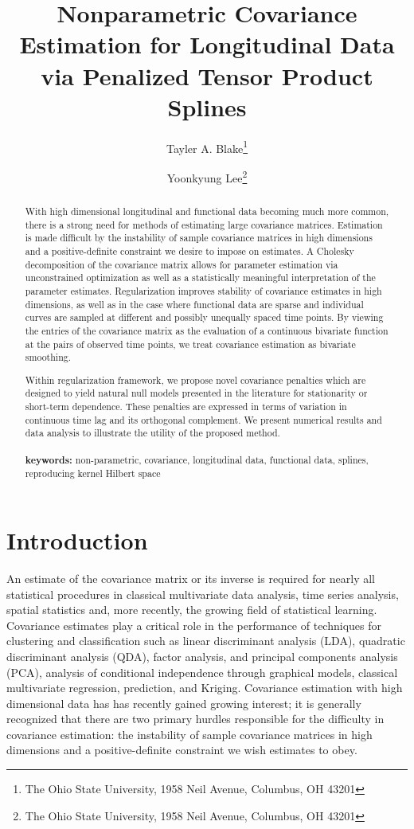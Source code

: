 \documentclass[12pt]{article}
\title{ Nonparametric Covariance Estimation for Longitudinal Data via Penalized Tensor Product Splines}
\author{Tayler A. Blake\thanks{The Ohio State University, 1958 Neil Avenue, Columbus, OH 43201} \and  Yoonkyung Lee\thanks{The Ohio State University, 1958 Neil Avenue, Columbus, OH 43201}}
\begin{document}

\maketitle

\begin{abstract}
With high dimensional longitudinal and functional data becoming much more common, there is a strong need for methods of estimating large covariance matrices. Estimation is made difficult  by the instability of sample covariance matrices in high dimensions and a positive-definite constraint we desire to impose on estimates. A Cholesky decomposition of the covariance matrix allows for parameter estimation via unconstrained optimization as well as a statistically meaningful interpretation of the parameter estimates. Regularization improves stability of covariance estimates in high dimensions, as well as in the case where functional data are sparse and individual curves are sampled at different and possibly unequally spaced time points. By viewing the entries of the covariance matrix as the evaluation of a continuous bivariate function at the pairs of observed time points, we treat covariance estimation as bivariate smoothing. 

Within regularization framework, we propose novel covariance penalties which are designed to yield natural null models presented in the literature for stationarity or short-term dependence. These penalties are expressed in terms of variation in continuous time lag and its orthogonal complement. We present numerical results and data analysis to illustrate the utility of the proposed method. \\
\\
{\bf keywords:} non-parametric, covariance, longitudinal data, functional data, splines, reproducing kernel Hilbert space
\end{abstract}


\section{Introduction}

\indent

An estimate of the covariance matrix or its inverse is required for nearly all statistical procedures in classical multivariate data analysis, time series analysis, spatial statistics and, more recently, the growing field of statistical learning. Covariance estimates play a critical role in the performance of techniques for clustering and classification such as linear discriminant analysis (LDA), quadratic discriminant analysis (QDA), factor analysis, and principal components analysis (PCA), analysis of conditional independence through graphical models, classical multivariate regression, prediction, and Kriging. Covariance estimation with high dimensional data has has recently gained growing interest; it is generally recognized that there are two primary hurdles responsible for the difficulty in covariance estimation: the instability of sample covariance matrices in high dimensions and a positive-definite constraint we wish estimates to obey.
\end{document}
